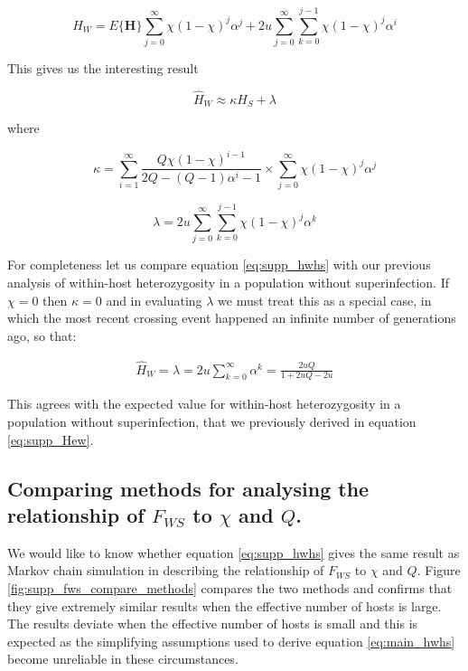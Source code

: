 \documentclass[_main.tex]{subfiles}
\begin{document}
\begin{equation}
\widehat{H}_W = E \{ \textbf{H} \} \sum_{j=0}^\infty \chi ( 1 - \chi )^j \alpha^j 
+ 
2u \sum_{j=0}^\infty \sum_{k=0}^{j-1}  \chi ( 1 - \chi )^j  \alpha^i
\end{equation}

This gives us the interesting result

\begin{equation}
\label{eq:supp_hwhs}
\widehat{H}_W \approx \kappa H_S + \lambda
\end{equation}

where

\begin{equation*}
\kappa =
\sum_{i=1}^\infty \frac{Q \chi (1-\chi)^{i-1}}{ 2Q - (Q-1) \alpha^i - 1}
\times
\sum_{j=0}^\infty \chi (1 - \chi)^j \alpha^j
\end{equation*}

\begin{equation*}
\lambda = 2u \sum_{j=0}^\infty \sum_{k=0}^{j-1}  \chi (1- \chi)^j \alpha^k
\end{equation*}

For completeness let us compare equation \ref{eq:supp_hwhs} with our previous analysis of within-host heterozygosity in a population without superinfection.  If $\chi=0$ then $\kappa =0$ and in evaluating $\lambda$ we must treat this as a special case, in which the most recent crossing event happened an infinite number of generations ago, so that:   

\begin{equation*}
\begin{aligned}
\widehat{H}_W = \lambda
= 2u \sum_{k=0}^\infty \alpha^k  = \frac{2uQ}{1 + 2uQ - 2u}
\end{aligned}
\end{equation*}

This agrees with the expected value for within-host heterozygosity in a population without superinfection, that we previously derived in equation \ref{eq:supp_Hew}.



\subsection{Comparing methods for analysing the relationship of $F_{WS}$ to $\chi$ and $Q$.}
\label{supp_compare_methods}

We would like to know whether equation \ref{eq:supp_hwhs} gives the same result as Markov chain simulation in describing the relationship of $F_{WS}$ to $\chi$ and $Q$.  Figure \ref{fig:supp_fws_compare_methods} compares the two methods and confirms that they give extremely similar results when the effective number of hosts is large.  The results deviate when the effective number of hosts is small and this is expected as the simplifying assumptions used to derive equation \ref{eq:main_hwhs} become unreliable in these circumstances.
\end{document}

